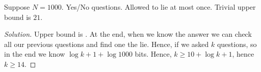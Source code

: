 \begin{application}
    Suppose $N = 1000$.
    Yes/No questions.
    Allowed to lie at most once.
    Trivial upper bound is $21$.
\end{application}
\begin{proof}[Solution]
    Upper bound is \hw. %
    At the end, when we know the answer we can check all our previous questions and find one the lie.
    Hence, if we asked $k$ questions, so in the end we know $\log {k + 1} + \log 1000$ bits.
    Hence, $k \geq 10 + \log {k + 1}$, hence $k \geq 14$.
\end{proof}